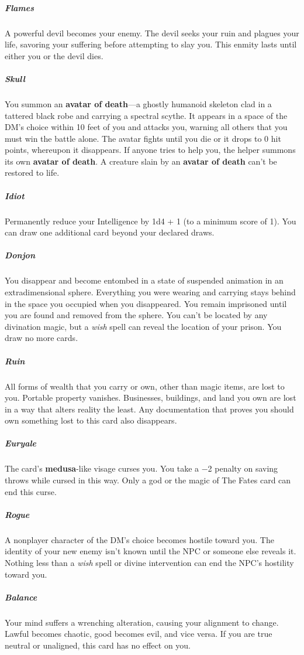 \documentclass[10pt,a4paper,twoside,bg=print,twocolumn,openany,nodeprecatedcode]{dndbook}
\begin{document}
\subparagraph{Flames}
A powerful devil becomes your enemy. The devil seeks your ruin and plagues your life, savoring your suffering before attempting to slay you. This enmity lasts until either you or the devil dies.

\subparagraph{Skull}
You summon an \textbf{avatar of death}—a ghostly humanoid skeleton clad in a tattered black robe and carrying a spectral scythe. It appears in a space of the DM's choice within 10 feet of you and attacks you, warning all others that you must win the battle alone. The avatar fights until you die or it drops to 0 hit points, whereupon it disappears. If anyone tries to help you, the helper summons its own \textbf{avatar of death}. A creature slain by an \textbf{avatar of death} can't be restored to life.

\subparagraph{Idiot}
Permanently reduce your Intelligence by 1d4 + 1 (to a minimum score of 1). You can draw one additional card beyond your declared draws.

\subparagraph{Donjon}
You disappear and become entombed in a state of suspended animation in an extradimensional sphere. Everything you were wearing and carrying stays behind in the space you occupied when you disappeared. You remain imprisoned until you are found and removed from the sphere. You can't be located by any divination magic, but a \textit{wish} spell can reveal the location of your prison. You draw no more cards.

\subparagraph{Ruin}
All forms of wealth that you carry or own, other than magic items, are lost to you. Portable property vanishes. Businesses, buildings, and land you own are lost in a way that alters reality the least. Any documentation that proves you should own something lost to this card also disappears.

\subparagraph{Euryale}
The card's \textbf{medusa}-like visage curses you. You take a −2 penalty on saving throws while cursed in this way. Only a god or the magic of The Fates card can end this curse.

\subparagraph{Rogue}
A nonplayer character of the DM's choice becomes hostile toward you. The identity of your new enemy isn't known until the NPC or someone else reveals it. Nothing less than a \textit{wish} spell or divine intervention can end the NPC's hostility toward you.

\subparagraph{Balance}
Your mind suffers a wrenching alteration, causing your alignment to change. Lawful becomes chaotic, good becomes evil, and vice versa. If you are true neutral or unaligned, this card has no effect on you.
\end{document}
